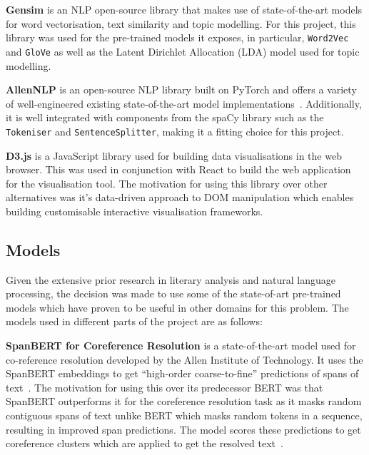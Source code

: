 \textbf{Gensim} is an NLP open-source library that makes use of state-of-the-art models for word vectorisation, text similarity and topic modelling. For this project, this library was used for the pre-trained models it exposes, in particular, \texttt{Word2Vec} and \texttt{GloVe} as well as the Latent Dirichlet Allocation (LDA) model used for topic modelling. 

\textbf{AllenNLP} is an open-source NLP library built on PyTorch and offers a variety of well-engineered existing state-of-the-art model implementations~\cite{allennlp}. Additionally, it is well integrated with components from the spaCy library such as the \texttt{Tokeniser} and \texttt{SentenceSplitter}, making it a fitting choice for this project. 

\textbf{D3.js} is a JavaScript library used for building data visualisations in the web browser. This was used in conjunction with React to build the web application for the visualisation tool. The motivation for using this library over other alternatives was it's data-driven approach to DOM manipulation which enables building customisable interactive visualisation frameworks. 


\subsection{Models} \label{s:models}

Given the extensive prior research in literary analysis and natural language processing, the decision was made to use some of the state-of-art pre-trained models which have proven to be useful in other domains for this problem. The models used in different parts of the project are as follows: 

\textbf{SpanBERT for Coreference Resolution} is a state-of-the-art model used for co-reference resolution developed by the Allen Institute of Technology. It uses the SpanBERT embeddings to get ``high-order coarse-to-fine'' predictions of spans of text~\cite{spanBERT}. The motivation for using this over its predecessor BERT was that SpanBERT outperforms it for the coreference resolution task as it masks random contiguous spans of text unlike BERT which masks random tokens in a sequence, resulting in improved span predictions. The model scores these predictions to get coreference clusters which are applied to get the resolved text~\cite{spanBERT}.

